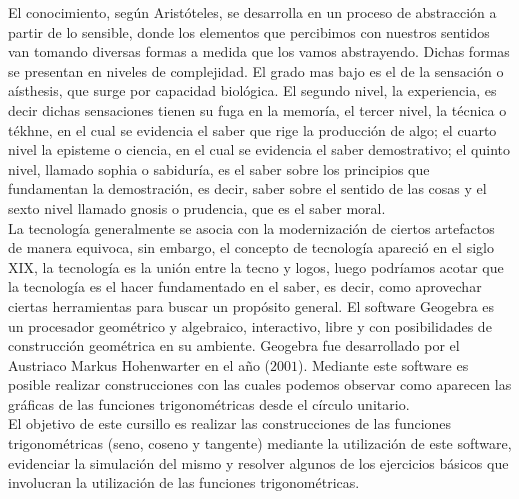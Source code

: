 \begin{titlepage}
\begin{minipage}{0.85\linewidth}
\begin{minipage}{0.85\linewidth}
\begin{resumen}
El conocimiento, seg\'un Arist\'oteles, se desarrolla en un proceso de
abstracci\'on a partir de lo sensible, donde los elementos que
percibimos con nuestros sentidos van tomando diversas formas a
medida que los vamos abstrayendo.  Dichas formas se presentan en
niveles de complejidad. El grado mas bajo es el de la sensaci\'on o
a\'isthesis, que surge por capacidad biol\'ogica.  El segundo nivel, la
experiencia, es decir dichas sensaciones tienen su fuga en la
memor\'ia, el tercer nivel, la t\'ecnica o t\'ekhne, en el cual se
evidencia el saber que rige la producci\'on de algo; el cuarto nivel
la episteme o ciencia, en el cual se evidencia el saber
demostrativo; el quinto nivel, llamado sophia o sabidur\'ia, es el
saber sobre los principios que fundamentan la demostraci\'on, es
decir, saber sobre el sentido de las cosas y el sexto nivel llamado
gnosis o prudencia, que es el saber moral.\\

La tecnolog\'ia generalmente se asocia con la modernizaci\'on de ciertos
artefactos de manera equivoca, sin embargo, el concepto de
tecnolog\'ia apareci\'o en el siglo XIX, la tecnolog\'ia es la uni\'on entre
la tecno y logos, luego podr\'iamos acotar que la tecnolog\'ia es el
hacer fundamentado en el saber, es decir, como aprovechar ciertas
herramientas para buscar un prop\'osito general.  El software Geogebra
es un procesador geom\'etrico y algebraico, interactivo, libre y con
posibilidades de construcci\'on geom\'etrica en su ambiente. Geogebra
fue desarrollado por el Austriaco Markus Hohenwarter en el a\~no
($2001$).  Mediante este software es posible realizar construcciones
con las cuales podemos observar como aparecen las gr\'aficas de las
funciones trigonom\'etricas desde el c\'irculo unitario.\\

El objetivo de este cursillo es realizar las construcciones de las
funciones trigonom\'etricas (seno, coseno y tangente) mediante la
utilizaci\'on de este software, evidenciar la simulaci\'on del mismo y
resolver algunos de los ejercicios b\'asicos que involucran la
utilizaci\'on de las funciones trigonom\'etricas.
    \end{resumen}
\end{minipage}
\vspace*{5pt}\\
\footnotesize
%  
    

\end{minipage}
\end{titlepage}
